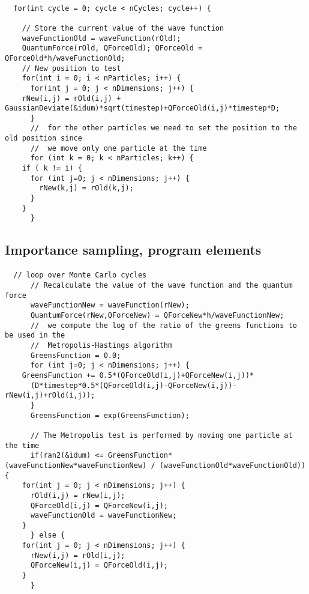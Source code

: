 \documentclass[%
twoside,                 %
final,                   %
10pt]{article}
\begin{document}
\paragraph{}
\begin{verbatim}
  for(int cycle = 0; cycle < nCycles; cycle++) {

    // Store the current value of the wave function
    waveFunctionOld = waveFunction(rOld);
    QuantumForce(rOld, QForceOld); QForceOld = QForceOld*h/waveFunctionOld;
    // New position to test
    for(int i = 0; i < nParticles; i++) {
      for(int j = 0; j < nDimensions; j++) {
	rNew(i,j) = rOld(i,j) + GaussianDeviate(&idum)*sqrt(timestep)+QForceOld(i,j)*timestep*D;
      }
      //  for the other particles we need to set the position to the old position since
      //  we move only one particle at the time
      for (int k = 0; k < nParticles; k++) {
	if ( k != i) {
	  for (int j=0; j < nDimensions; j++) {
	    rNew(k,j) = rOld(k,j);
	  }
	} 
      }
\end{verbatim}




\subsection*{Importance sampling, program elements}

\paragraph{}
\begin{verbatim}
  // loop over Monte Carlo cycles
      // Recalculate the value of the wave function and the quantum force
      waveFunctionNew = waveFunction(rNew);
      QuantumForce(rNew,QForceNew) = QForceNew*h/waveFunctionNew;
      //  we compute the log of the ratio of the greens functions to be used in the 
      //  Metropolis-Hastings algorithm
      GreensFunction = 0.0;            
      for (int j=0; j < nDimensions; j++) {
	GreensFunction += 0.5*(QForceOld(i,j)+QForceNew(i,j))*
	  (D*timestep*0.5*(QForceOld(i,j)-QForceNew(i,j))-rNew(i,j)+rOld(i,j));
      }
      GreensFunction = exp(GreensFunction);

      // The Metropolis test is performed by moving one particle at the time
      if(ran2(&idum) <= GreensFunction*(waveFunctionNew*waveFunctionNew) / (waveFunctionOld*waveFunctionOld)) {
	for(int j = 0; j < nDimensions; j++) {
	  rOld(i,j) = rNew(i,j);
	  QForceOld(i,j) = QForceNew(i,j);
	  waveFunctionOld = waveFunctionNew;
	}
      } else {
	for(int j = 0; j < nDimensions; j++) {
	  rNew(i,j) = rOld(i,j);
	  QForceNew(i,j) = QForceOld(i,j);
	}
      }
\end{verbatim}
\end{document}
